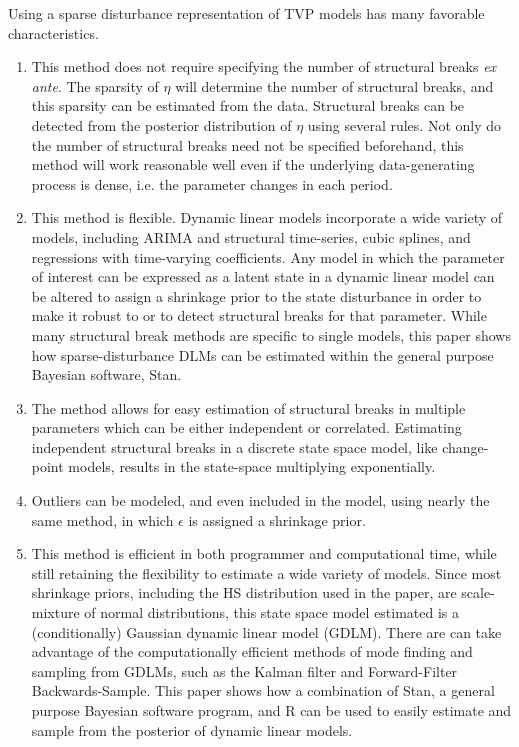 \documentclass{article}
\newcommand{\RLang}{\textsf{R}}
\newcommand{\Stan}{Stan}
\begin{document}
Using a sparse disturbance representation of TVP models has many favorable characteristics.
\begin{enumerate}
\item This method does not require specifying the number of structural breaks \textit{ex ante}.
The sparsity of $\eta$ will determine the number of structural breaks, and this sparsity can be estimated from the data.
Structural breaks can be detected from the posterior distribution of $\eta$ using several rules.
Not only do the number of structural breaks need not be specified beforehand, this method will work reasonable well even if the underlying data-generating process is dense, i.e. the parameter changes in each period.
\item This method is flexible.
Dynamic linear models incorporate a wide variety of models, including ARIMA and structural time-series, cubic splines, and regressions with time-varying coefficients.
Any model in which the parameter of interest can be expressed as a latent state in a dynamic linear model can be altered to assign a shrinkage prior to the state disturbance in order to make it robust to or to detect structural breaks for that parameter.
While many structural break methods are specific to single models, this paper shows how sparse-disturbance DLMs can be estimated within the general purpose Bayesian software, Stan.
\item The method allows for easy estimation of structural breaks in multiple parameters which can be either independent or correlated.
Estimating independent structural breaks in a discrete state space model, like change-point models, results in the state-space multiplying exponentially.
\item Outliers can be modeled, and even included in the model, using nearly the same method, in which $\epsilon$ is assigned a shrinkage prior.
\item This method is efficient in both programmer and computational time, while still retaining the flexibility to estimate a wide variety of models.
Since most shrinkage priors, including the HS distribution used in the paper, are scale-mixture of normal distributions, this state space model estimated is a (conditionally) Gaussian dynamic linear model (GDLM). There are can take advantage of the computationally efficient methods of mode finding and sampling from GDLMs, such as the Kalman filter and Forward-Filter Backwards-Sample.
This paper shows how a combination of \Stan, a general purpose Bayesian software program, and \RLang{} can be used to easily estimate and sample from the posterior of dynamic linear models.
\end{enumerate}
\end{document}

